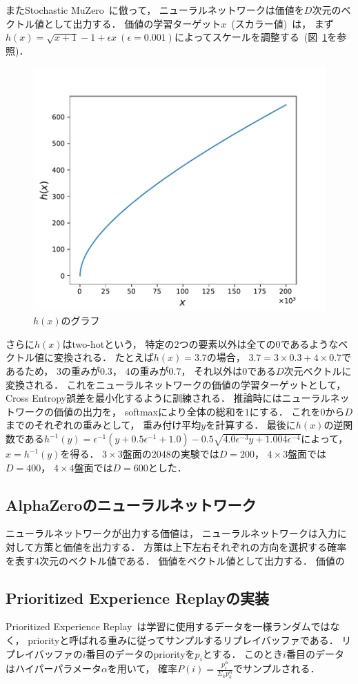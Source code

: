 またStochastic MuZero~\cite{StochasticMuZero}に倣って， ニューラルネットワークは価値を$D$次元のベクトル値として出力する．
価値の学習ターゲット$x$~(スカラー値)~は， まず$h(x)= \sqrt{x+1} - 1 + \epsilon x \ (\epsilon=0.001)$によってスケールを調整する~(図~\ref{fig:transform}を参照)．
\begin{figure}[t]
    \centering
    \includegraphics[width=0.6\linewidth{}]{figures/transform_.pdf}
    \caption{$h(x)$のグラフ}
    \label{fig:transform}
\end{figure}
さらに$h(x)$はtwo-hotという， 特定の$2$つの要素以外は全ての$0$であるようなベクトル値に変換される．
たとえば$h(x)=3.7$の場合， $3.7=3 \times 0.3 + 4 \times 0.7$であるため， $3$の重みが$0.3$， $4$の重みが$0.7$， それ以外は$0$である$D$次元ベクトルに変換される．
これをニューラルネットワークの価値の学習ターゲットとして， Cross Entropy誤差を最小化するように訓練される．
推論時にはニューラルネットワークの価値の出力を， softmaxにより全体の総和を$1$にする．
これを$0$から$D$までのそれぞれの重みとして， 重み付け平均$y$を計算する．
最後に$h(x)$の逆関数である$h^{-1}(y)= \epsilon^{-1} (y + 0.5\epsilon^{-1} + 1.0) - 0.5 \sqrt{4.0 \epsilon^{-3} y + 1.004 \epsilon^{-4}}$によって， $x=h^{-1}(y)$を得る．
$3\times3$盤面の2048の実験では$D=200$， $4\times3$盤面では$D=400$， $4\times4$盤面では$D=600$とした．

\subsection{AlphaZeroのニューラルネットワーク}
ニューラルネットワークが出力する価値は， 
ニューラルネットワークは入力に対して方策と価値を出力する．
方策は上下左右それぞれの方向を選択する確率を表す$4$次元のベクトル値である．
価値をベクトル値として出力する．
価値の

\subsection{Prioritized Experience Replayの実装}
Prioritized Experience Replay~\cite{prioritized}は学習に使用するデータを一様ランダムではなく， priorityと呼ばれる重みに従ってサンプルするリプレイバッファである．
リプレイバッファの$i$番目のデータのpriorityを$p_i$とする．
このとき$i$番目のデータはハイパーパラメータ$\alpha$を用いて， 確率$P(i) = \frac{p_{i}^{\alpha}}{\Sigma_k p_{k}^{\alpha}}$でサンプルされる．

